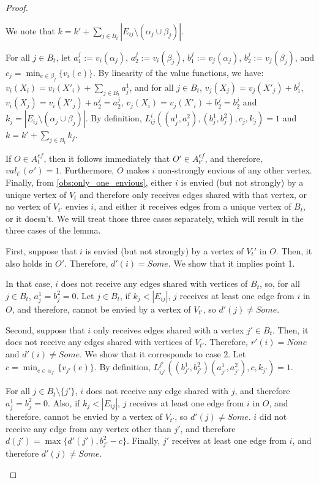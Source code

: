 \documentclass[11pt,letterpaper]{article}
\begin{document}
\begin{proof}
\begin{nestedproof}
        We note that $k=k'+\sum_{j\in B_t}|E_{ij}\setminus(\alpha_j\cup\beta_j)|$.

        For all $j\in B_t$, let $a^j_1:= v_i(\alpha_j)$, $a^j_2:= v_i(\beta_j)$, $b^j_1:= v_j(\alpha_j)$, $b^j_2:= v_j(\beta_j)$, and $c_j=\min_{e\in \beta_j}\{v_i(e)\}$. By linearity of the value functions, we have: $v_i(X_i)=v_i(X'_i)+\sum_{j\in B_t}a_j^1$, and for all $j\in B_t$, $v_j(X_j)=v_j(X'_j)+b^j_1$, $v_i(X_j)=v_i(X'_j)+a_2^j=a_2^j$, $v_j(X_i)=v_j(X'_i)+b_2^j=b_2^j$ and $k_j=|E_{ij}\setminus(\alpha_j\cup\beta_j)|$. By definition, $L_{ij}^i((a_j^1,a_j^2),(b_j^1,b_j^2),c_j,k_j)=1$ and $k=k'+\sum_{j\in B_t}k_j$.

        If $O\in A_t^{ef}$, then it follows immediately that $O'\in A_{t'}^{ef}$, and therefore, $val_{t'}(\sigma')=1$. Furthermore, $O$ makes $i$ non-strongly envious of any other vertex. Finally, from \cref{obs:only_one_envious}, either $i$ is envied (but not strongly) by a unique vertex of $V_t$ and therefore only receives edges shared with that vertex, or no vertex of $V_{t'}$ envies $i$, and either it receives edges from a unique vertex of $B_t$, or it doesn't. We will treat those three cases separately, which will result in the three cases of the lemma.

        First, suppose that $i$ is envied (but not strongly) by a vertex of $V_t'$ in $O$. Then, it also holds in $O'$. Therefore, $d'(i)=Some$. We show that it implies point 1.

        In that case, $i$ does not receive any edges shared with vertices of $B_t$, so, for all $j\in B_t$, $a_j^1=b_j^2=0$. Let $j\in B_t$, if $k_j<|E_{ij}|$, $j$ receives at least one edge from $i$ in $O$, and therefore, cannot be envied by a vertex of $V_{t'}$, so $d'(j)\neq Some$.

        Second, suppose that $i$ only receives edges shared with a vertex $j'\in B_t$. Then, it does not receive any edges shared with vertices of $V_{t'}$. Therefore, $r'(i)=None$ and $d'(i)\neq Some$. We show that it corresponds to case 2. Let $c=\min_{e\in \alpha_{j'}}\{v_{j'}(e)\}$. By definition, $L_{ij'}^{j'}((b_{j'}^1,b_{j'}^2)(a_{j'}^1,a_{j'}^2),c,k_{j'})=1$.

        For all $j\in B_t\setminus\{j'\}$, $i$ does not receive any edge shared with $j$, and therefore $a_{j}^1=b_{j}^2=0$. Also, if $k_j<|E_{ij}|$, $j$ receives at least one edge from $i$ in $O$, and therefore, cannot be envied by a vertex of $V_{t'}$, so $d'(j)\neq Some$. $i$ did not receive any edge from any vertex other than $j'$, and therefore $d(j')=\max\{d'(j'),b_{j'}^2-c\}$. Finally, $j'$ receives at least one edge from $i$, and therefore $d'(j)\neq Some$.


\end{nestedproof}
\end{proof}
\end{document}

